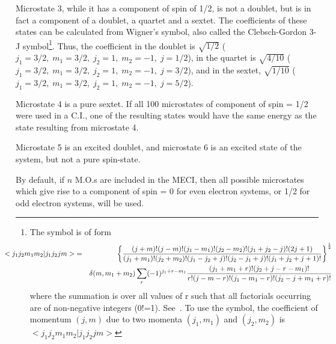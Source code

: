 Microstate 3, while it has a component of spin of  1/2,  is  not  a doublet,
but  is  in  fact  a  component  of a doublet, a quartet and a sextet.  The
coefficients of these states can  be  calculated  from  Wigner's symbol, also
called the  Clebsch-Gordon  3-J  symbol\footnote{\samepage The symbol is of form
\begin{eqnarray}
\hspace*{-0.5in}<j_1j_2m_1m_2|j_1j_2jm>&=&
\left \{\frac{(j+m)!(j-m)!(j_1-m_1)!(j_2-m_2)!(j_1+j_2-j)!(2j+1)}
{(j_1+m_1)!(j_2+m_2)!(j_1-j_2+j)!(j_2-j_1+j)!(j_1+j_2+j+1)!}\right \}^{\frac{1}{2}}
\nonumber \\
&&\delta(m,m_1+m_2)\sum_r(-1)^{j_1+r-m_1}\frac{(j_1+m_1+r)!(j_2+j-r-m_1)!}
{r!(j-m-r)!(j_1-m_1-r)!(j_2-j+m_1+r)!} \nonumber
\end{eqnarray}
where the summation is over all values of r such that all factorials occurring
are of non-negative integers (0!=1). See~\cite{griffith}. To use the symbol,
the coefficient of momentum $(j,m)$ due to two momenta $(j_1,m_1)$ and
$(j_2,m_2)$ is
$<j_1j_2m_1m_2|j_1j_2jm>$
}.
Thus, the coefficient in the doublet is $\sqrt{1/2}$ ($j_1=3/2,\; m_1=3/2,
\;j_2=1, \;m_2=-1, \;j=1/2$), in the quartet is $\sqrt{4/10}$ ($j_1=3/2,\;
m_1=3/2, \;j_2=1, \;m_2=-1, \;j=3/2$), and in the sextet,  $\sqrt{1/10}$
($j_1=3/2,\; m_1=3/2, \;j_2=1, \;m_2=-1, \;j=5/2$).

Microstate 4 is a pure sextet.  If all 100 microstates of component of  spin
=  1/2  were used in a C.I., one of the resulting states would have the same
energy as the state resulting from microstate 4.

Microstate 5 is an excited doublet, and microstate 6 is an  excited state of
the system, but not a pure spin-state.

By default, if $n$ M.O.s are included in the MECI, then all possible
microstates which give rise to a component of spin = 0 for even electron
systems, or 1/2 for odd electron systems, will be used.

